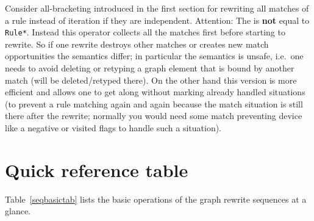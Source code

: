 \begin{note}
Consider all-bracketing introduced in the first section for rewriting all matches of a rule instead of iteration if they are independent.
Attention: The  is \textbf{not} equal to \texttt{Rule*}.
Instead this operator collects all the matches first before starting to rewrite.
So if one rewrite destroys other matches or creates new match opportunities the semantics differ;
in particular the semantics is unsafe, i.e.\ one needs to avoid deleting or retyping a graph element that is bound by another match (will be deleted/retyped there). On the other hand this version is more efficient and allows one to get along without marking already handled situations (to prevent a rule matching again and again because the match situation is still there after the rewrite; normally you would need some match preventing device like a negative or visited flags to handle such a situation).
\end{note}


\section{Quick reference table}

Table~\ref{seqbasictab} lists the basic operations of the graph rewrite sequences at a glance.

